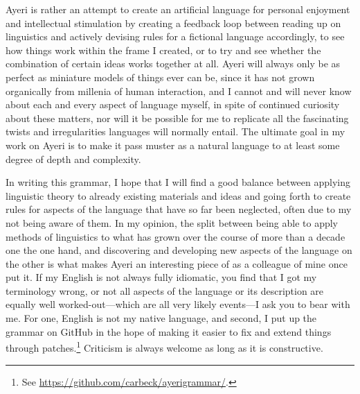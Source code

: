 Ayeri is rather an attempt to create an artificial language for personal 
enjoyment and intellectual stimulation by creating a feedback loop between 
reading up on linguistics and actively devising rules for a fictional language 
accordingly, to see how things work within the frame I created, or to try and 
see whether the combination of certain ideas works together at all. Ayeri will 
always only be as perfect as miniature models of things ever can be, since it 
has not grown organically from millenia of human interaction, and I cannot and 
will never know about each and every aspect of language myself, in spite of 
continued curiosity about these matters, nor will it be possible for me to 
replicate all the fascinating twists and irregularities languages will normally 
entail. The ultimate goal in my work on Ayeri is to make it pass muster as a 
natural language to at least some degree of depth and complexity.

In writing this grammar, I hope that I will find a good balance between 
applying linguistic theory to already existing materials and ideas and going 
forth to create rules for aspects of the language that have so far been 
neglected, often due to my not being aware of them. In my opinion, the split 
between being able to apply methods of linguistics to what has grown over the 
course of more than a decade one the one hand, and discovering and developing 
new aspects of the language on the other is what makes Ayeri an interesting 
piece of  as a colleague of mine once put it.
If my English is not always fully idiomatic, you find that I got my terminology 
wrong, or not all aspects of the language or its description are equally well 
worked-out---which are all very likely events---I ask you to bear with me. For 
one, English is not my native language, and second, I put up the grammar on 
GitHub in the hope of making it easier to fix and extend things through 
patches.\footnote{See 
\href{https://github.com/carbeck/ayerigrammar}{https://github.com/carbeck/ayerigrammar/}.}
Criticism is always welcome as long as it is constructive.
